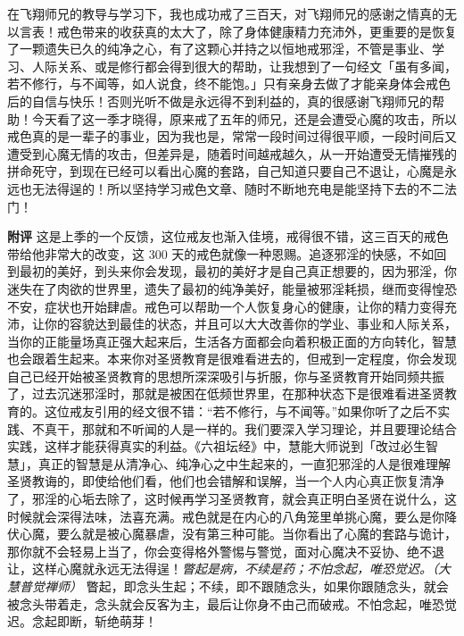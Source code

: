 \begin{case}
    在飞翔师兄的教导与学习下，我也成功戒了三百天，对飞翔师兄的感谢之情真的无以言表！戒色带来的收获真的太大了，除了身体健康精力充沛外，更重要的是恢复了一颗遗失已久的纯净之心，有了这颗心并持之以恒地戒邪淫，不管是事业、学习、人际关系、或是修行都会得到很大的帮助，让我想到了一句经文「虽有多闻，若不修行，与不闻等，如人说食，终不能饱。」只有亲身去做了才能亲身体会戒色后的自信与快乐！否则光听不做是永远得不到利益的，真的很感谢飞翔师兄的帮助！今天看了这一季才晓得，原来戒了五年的师兄，还是会遭受心魔的攻击，所以戒色真的是一辈子的事业，因为我也是，常常一段时间过得很平顺，一段时间后又遭受到心魔无情的攻击，但差异是，随着时间越戒越久，从一开始遭受无情摧残的拼命死守，到现在已经可以看出心魔的套路，自己知道只要自己不退让，心魔是永远也无法得逞的！所以坚持学习戒色文章、随时不断地充电是能坚持下去的不二法门！

    \textbf{附评} 这是上季的一个反馈，这位戒友也渐入佳境，戒得很不错，这三百天的戒色带给他非常大的改变，这 300 天的戒色就像一种恩赐。追逐邪淫的快感，不如回到最初的美好，到头来你会发现，最初的美好才是自己真正想要的，因为邪淫，你迷失在了肉欲的世界里，遗失了最初的纯净美好，能量被邪淫耗损，继而变得惶恐不安，症状也开始肆虐。戒色可以帮助一个人恢复身心的健康，让你的精力变得充沛，让你的容貌达到最佳的状态，并且可以大大改善你的学业、事业和人际关系，当你的正能量场真正强大起来后，生活各方面都会向着积极正面的方向转化，智慧也会跟着生起来。本来你对圣贤教育是很难看进去的，但戒到一定程度，你会发现自己已经开始被圣贤教育的思想所深深吸引与折服，你与圣贤教育开始同频共振了，过去沉迷邪淫时，那就是被困在低频世界里，在那种状态下是很难看进圣贤教育的。这位戒友引用的经文很不错：“若不修行，与不闻等。”如果你听了之后不实践、不真干，那就和不听闻的人是一样的。我们要深入学习理论，并且要理论结合实践，这样才能获得真实的利益。《六祖坛经》中，慧能大师说到「改过必生智慧」，真正的智慧是从清净心、纯净心之中生起来的，一直犯邪淫的人是很难理解圣贤教诲的，即使给他们看，他们也会错解和误解，当一个人内心真正恢复清净了，邪淫的心垢去除了，这时候再学习圣贤教育，就会真正明白圣贤在说什么，这时候就会深得法味，法喜充满。戒色就是在内心的八角笼里单挑心魔，要么是你降伏心魔，要么就是被心魔暴虐，没有第三种可能。当你看出了心魔的套路与诡计，那你就不会轻易上当了，你会变得格外警惕与警觉，面对心魔决不妥协、绝不退让，这样心魔就永远无法得逞！\textit{瞥起是病，不续是药；不怕念起，唯恐觉迟。（大慧普觉禅师）} 瞥起，即念头生起；不续，即不跟随念头，如果你跟随念头，就会被念头带着走，念头就会反客为主，最后让你身不由己而破戒。不怕念起，唯恐觉迟。念起即断，斩绝萌芽！
\end{case}

